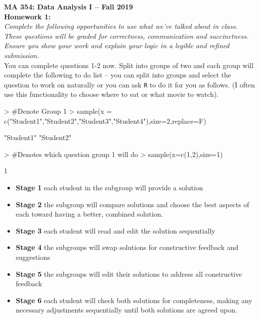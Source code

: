 \documentclass{article}
\begin{document}

\noindent \textbf{MA 354: Data Analysis I -- Fall 2019}\\%
\noindent \textbf{Homework 1:}\vspace{1em}\\
\emph{Complete the following opportunities to use what we've talked about in class. 
These questions will be graded for correctness, communication and succinctness. Ensure
you show your work and explain your logic in a legible and refined submission.}\\

You can complete questions 1-2 now. Split into groups of two and each group
will complete the following to do list -- you can split into groups and
select the question to work on naturally or you can ask \texttt{R} to do 
it for you as follows. (I often use this functionality to choose where to
eat or what movie to watch).
\begin{Schunk}
\begin{Sinput}
> #Denote Group 1
> sample(x = c("Student1","Student2","Student3","Student4"),size=2,replace=F)
\end{Sinput}
\begin{Soutput}
[1] "Student1" "Student2"
\end{Soutput}
\begin{Sinput}
> #Denotes which question group 1 will do
> sample(x=c(1,2),size=1)
\end{Sinput}
\begin{Soutput}
[1] 1
\end{Soutput}
\end{Schunk}

\begin{itemize}
  \item \textbf{Stage 1} each student in the subgroup will provide a solution
  \item \textbf{Stage 2} the subgroup will compare solutions and choose the best aspects
  of each toward having a better, combined solution.
  \item \textbf{Stage 3} each student will read and edit the solution sequentially
  \item \textbf{Stage 4} the subgroups will swap solutions for constructive feedback 
  and suggestions
  \item \textbf{Stage 5} the subgroups will edit their solutions to address all constructive 
  feedback
  \item \textbf{Stage 6} each student will check both solutions for completeness, making
  any necessary adjustments sequentially until both solutions are agreed upon.
\end{itemize}
\end{document}
